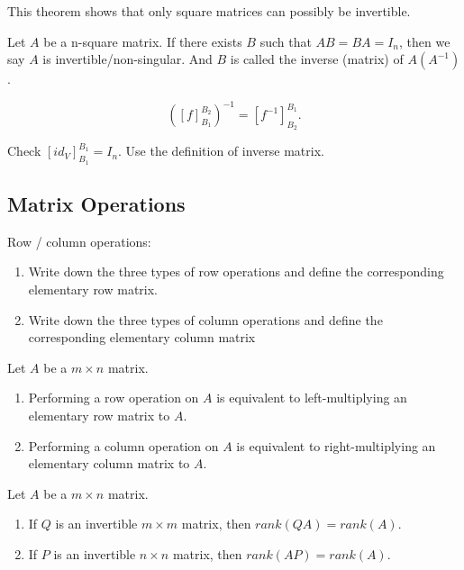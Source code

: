 \documentclass[12pt]{article}
\begin{document}
This theorem shows that only square matrices can possibly be invertible. 

\begin{definition}
    Let $A$ be a n-square matrix. If there exists $B$ such that $AB=BA=I_n$,
    then we say $A$ is invertible/non-singular. And $B$ is called the inverse (matrix) of $A (A^{-1})$. 
\end{definition}

\begin{theorem}
    \[([f]^{B_2}_{B_1})^{-1} = [f^{-1}]^{B_1}_{B_2}.\]
\end{theorem}
Check $[id_V]^{B_1}_{B_1}=I_n$. Use the definition of inverse matrix.


\subsection{Matrix Operations}

\begin{exercise}
    Row / column operations:
    \begin{enumerate}
        \item Write down the three types of row operations and define the corresponding elementary row matrix.
        \item Write down the three types of column operations and define the corresponding elementary column matrix
    \end{enumerate}
\end{exercise}

\begin{theorem}
    Let $A$ be a $m\times n$ matrix.
    \begin{enumerate}
        \item Performing a row operation on $A$ is equivalent to left-multiplying an elementary row matrix to $A$.
        \item Performing a column operation on $A$ is equivalent to right-multiplying an elementary column matrix to $A$.
    \end{enumerate}
\end{theorem}


\begin{theorem}
    Let $A$ be a $m\times n$ matrix.
    \begin{enumerate}
        \item If $Q$ is an invertible $m\times m$ matrix, then $rank(QA)=rank(A)$.
        \item If $P$ is an invertible $n\times n$ matrix, then $rank(AP)=rank(A)$.
    \end{enumerate}
\end{theorem}
\end{document}
